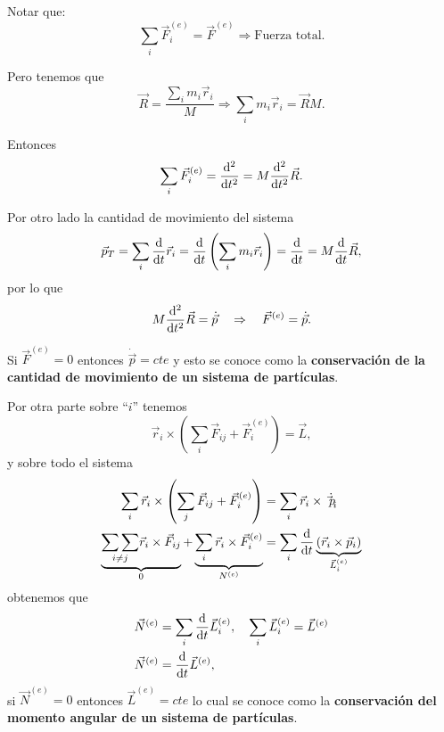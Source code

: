 \documentclass[../main]{subfiles}
\begin{document}
Notar que:
\begin{equation}
    \sum_i \vec{F}_i^{(e)}=\vec{F}^{(e)} \Rightarrow \text{Fuerza total}.
\end{equation}

Pero tenemos que
\begin{equation}
    \vec{R}=\dfrac{\sum_i m_i \vec{r}_i}{M} \Rightarrow \sum_i m_i \vec{r}_i=\vec{R}M.
\end{equation}

Entonces
\begin{equation}
    \sum_i \vec{F}_i^{(e)}=\dv{^2}{t^2}(\vec{R}M)=M\dv{^2}{t^2}\vec{R}.
\end{equation}

Por otro lado la cantidad de movimiento del sistema
\begin{equation}
    \vec{p}_T=\sum_i \dv{}{t}\vec{r}_i=\dv{}{t}\left(\sum_i m_i \vec{r}_i\right)=\dv{}{t}(\vec{R}M)=M\dv{}{t}\vec{R},
\end{equation}
por lo que
\begin{equation}
    M\dv{^2}{t^2}\vec{R}=\dot{\vec{p}} \quad \Rightarrow \quad \vec{F}^{(e)}=\dot{\vec{p}}.
\end{equation}

Si $\vec{F}^{(e)}=0$ entonces $\dot{\vec{p}}=cte$ y esto se conoce como la \textbf{conservación de la cantidad de movimiento de un sistema de partículas}.

Por otra parte sobre ``$i$'' tenemos
\begin{equation}
    \vec{r}_i\times \left(\sum_i \vec{F}_{ij}+\vec{F}_i^{(e)}\right)=\vec{L},
\end{equation}
y sobre todo el sistema
\begin{align}
    \sum_i \vec{r}_i \times \left(\sum_j \vec{F}_{ij}+\vec{F}_i^{(e)}\right)&=\sum_i \vec{r}_i \times \dot{\vec{p}_i}\\
    \underbrace{\underset{i\neq j}{\sum \sum}\vec{r}_i \times \vec{F}_{ij}}_{0}+\underbrace{\sum_i \vec{r}_i\times \vec{F}_i^{(e)}}_{N^{(e)}}&=\sum_i \dv{}{t}\underbrace{(\vec{r}_i \times \vec{p}_i)}_{\vec{L}_i^{(e)}}
\end{align}
obtenemos que 
\begin{align}
    \vec{N}^{(e)}&=\sum_i \dv{}{t}\vec{L}_i^{(e)}, \quad \sum_i \vec{L}_i^{(e)}=\vec{L}^{(e)}\\
    \vec{N}^{(e)}&=\dv{}{t}\vec{L}^{(e)},
\end{align}
si $\vec{N}^{(e)}=0$ entonces $\vec{L}^{(e)}=cte$ lo cual se conoce como la \textbf{conservación del momento angular de un sistema de partículas}.
\end{document}
